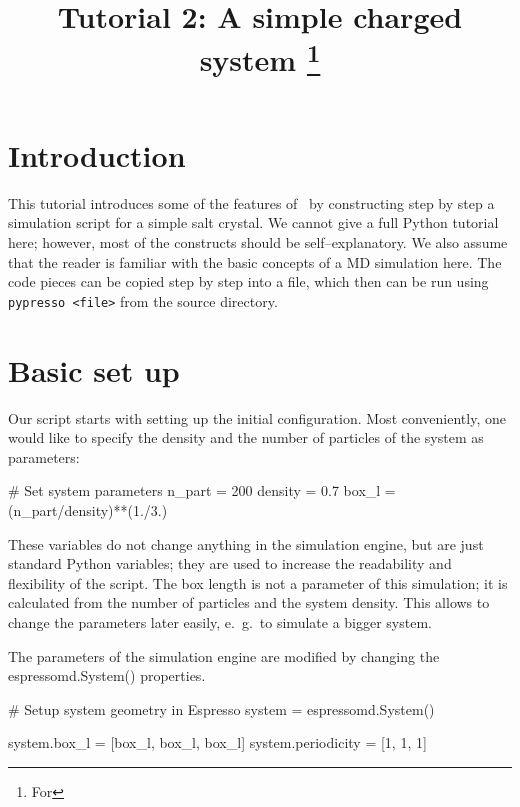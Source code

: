 \documentclass[
a4paper,                        %
11pt,                           %
twoside,                        %
footsepline,                    %
headsepline,                    %
headexclude,                    %
footexclude,                    %
pagesize,                       %
]{scrartcl}
\begin{document}
\esptitlehead
\title{Tutorial 2: A simple charged system%
\ifdefined\esversion%
\thanks{For \es \esversion}%
\fi%
}

\maketitle
\tableofcontents

\section{Introduction}

This tutorial introduces some of the features of \es\ by constructing
step by step a simulation script for a simple salt crystal.  We cannot
give a full Python tutorial here; however, most of the constructs should
be self--explanatory. We also assume that the reader is familiar with
the basic concepts of a MD simulation here. The code pieces can be
copied step by step into a file, which then can be run using
\verb|pypresso <file>| from the \es source directory.

\section{Basic set up}

Our script starts with setting up the initial configuration.  Most
conveniently, one would like to specify the density and the number of
particles of the system as parameters:

\begin{tclcode}
# Set system parameters
n_part = 200
density = 0.7
box_l = (n_part/density)**(1./3.)
\end{tclcode}

These variables do not change anything in the simulation engine, but
are just standard Python variables; they are used to increase the
readability and flexibility of the script. The box length is not a
parameter of this simulation; it is calculated from the number of
particles and the system density. This allows to change the parameters
later easily, e.~g.\ to simulate a bigger system.

The parameters of the simulation engine are modified by changing the
espressomd.System() properties.

\begin{tclcode}
# Setup system geometry in Espresso
system = espressomd.System()

system.box_l = [box_l, box_l, box_l]
system.periodicity = [1, 1, 1]
\end{tclcode}
\end{document}
